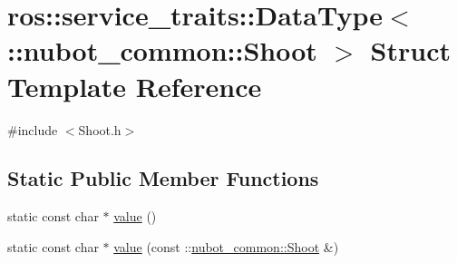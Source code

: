 \hypertarget{structros_1_1service__traits_1_1DataType_3_01_1_1nubot__common_1_1Shoot_01_4}{\section{ros\-:\-:service\-\_\-traits\-:\-:Data\-Type$<$ \-:\-:nubot\-\_\-common\-:\-:Shoot $>$ Struct Template Reference}
\label{structros_1_1service__traits_1_1DataType_3_01_1_1nubot__common_1_1Shoot_01_4}
}


{\ttfamily \#include $<$Shoot.\-h$>$}

\subsection*{Static Public Member Functions}
\begin{DoxyCompactItemize}
\item 
static const char $\ast$ \hyperlink{structros_1_1service__traits_1_1DataType_3_01_1_1nubot__common_1_1Shoot_01_4_a75816380ea21665d76acae2c1ca14c76}{value} ()
\item 
static const char $\ast$ \hyperlink{structros_1_1service__traits_1_1DataType_3_01_1_1nubot__common_1_1Shoot_01_4_ad3ed5ed0f2637f9b4defce0dc5e95b33}{value} (const \-::\hyperlink{structnubot__common_1_1Shoot}{nubot\-\_\-common\-::\-Shoot} \&)
\end{DoxyCompactItemize}


